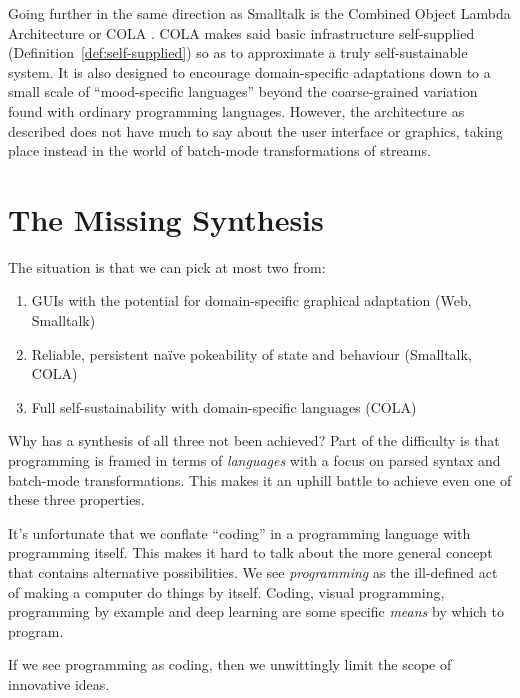 Going further in the same direction as Smalltalk is the Combined Object
Lambda Architecture or COLA \cite{COLAs}. COLA makes said basic
infrastructure self-supplied (Definition~\ref{def:self-supplied}) so as
to approximate a truly self-sustainable system. It is also designed to
encourage domain-specific adaptations down to a small scale of
``mood-specific languages'' beyond the coarse-grained variation found
with ordinary programming languages. However, the architecture as
described does not have much to say about the user interface or
graphics, taking place instead in the world of batch-mode
transformations of streams.

\hypertarget{the-missing-synthesis}{%
\section{The Missing Synthesis}\label{the-missing-synthesis}}

The situation is that we can pick at most two from:

\begin{enumerate}
\def\labelenumi{\arabic{enumi}.}
\tightlist
\item
  GUIs with the potential for domain-specific graphical adaptation (Web,
  Smalltalk)
\item
  Reliable, persistent naïve pokeability of state and behaviour
  (Smalltalk, COLA)
\item
  Full self-sustainability with domain-specific languages (COLA)
\end{enumerate}

Why has a synthesis of all three not been achieved? Part of the
difficulty is that programming is framed in terms of \emph{languages}
with a focus on parsed syntax and batch-mode transformations. This makes
it an uphill battle to achieve even one of these three properties.

It's unfortunate that we conflate ``coding'' in a programming language
with programming itself. This makes it hard to talk about the more
general concept that contains alternative possibilities. We see
\emph{programming} as the ill-defined act of making a computer do things
by itself. Coding, visual programming, programming by example and deep
learning are some specific \emph{means} by which to program.

If we see programming as coding, then we unwittingly limit the scope of
innovative ideas.

